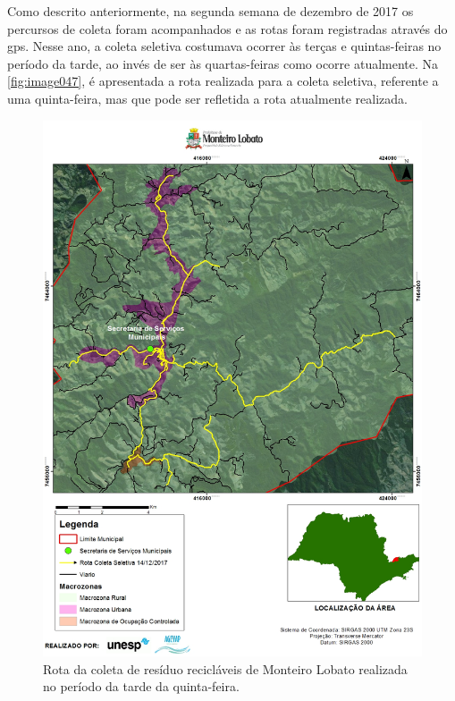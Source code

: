 Como descrito anteriormente, na segunda semana de dezembro de 2017 os percursos de coleta foram acompanhados e as rotas foram registradas através do \gls{gps}. Nesse ano, a coleta seletiva costumava ocorrer às terças e quintas-feiras no período da tarde, ao invés de ser às quartas-feiras como ocorre atualmente. Na \autoref{fig:image047}, é apresentada a rota realizada para a coleta seletiva, referente a uma quinta-feira, mas que pode ser refletida a rota atualmente realizada.

\begin{figure}
	\centering
	\includegraphics[width=1\linewidth]{produtos/prodtres/image047}
	\caption{Rota da coleta de resíduo recicláveis de Monteiro Lobato realizada no período da tarde da quinta-feira.}
	\label{fig:image047}
\end{figure}


